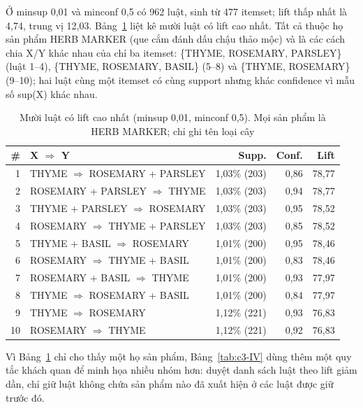 Ở minsup 0,01 và minconf 0,5 có 962 luật, sinh từ 477 itemset; lift thấp nhất là 4,74, trung vị 12,03. Bảng~\ref{tab:c3-III} liệt kê mười luật có lift cao nhất. Tất cả thuộc họ sản phẩm HERB MARKER (que cắm đánh dấu chậu thảo mộc) và là các cách chia X/Y khác nhau của chỉ ba itemset: \{THYME, ROSEMARY, PARSLEY\} (luật 1--4), \{THYME, ROSEMARY, BASIL\} (5--8) và \{THYME, ROSEMARY\} (9--10); hai luật cùng một itemset có cùng support nhưng khác confidence vì mẫu số sup(X) khác nhau.

\begin{table}[!t]
\centering\footnotesize
\caption{Mười luật có lift cao nhất (minsup 0,01, minconf 0,5). Mọi sản phẩm là
HERB MARKER; chỉ ghi tên loại cây}
\label{tab:c3-III}
\setlength{\tabcolsep}{3pt}
\begin{tabular}{rlrrr}
\hline
\textbf{\#} & \textbf{X $\Rightarrow$ Y} & \textbf{Supp.} & \textbf{Conf.} & \textbf{Lift} \\ \hline
1 & THYME $\Rightarrow$ ROSEMARY + PARSLEY & 1,03\% (203) & 0,86 & 78,77 \\
2 & ROSEMARY + PARSLEY $\Rightarrow$ THYME & 1,03\% (203) & 0,94 & 78,77 \\
3 & THYME + PARSLEY $\Rightarrow$ ROSEMARY & 1,03\% (203) & 0,95 & 78,52 \\
4 & ROSEMARY $\Rightarrow$ THYME + PARSLEY & 1,03\% (203) & 0,85 & 78,52 \\
5 & THYME + BASIL $\Rightarrow$ ROSEMARY & 1,01\% (200) & 0,95 & 78,46 \\
6 & ROSEMARY $\Rightarrow$ THYME + BASIL & 1,01\% (200) & 0,83 & 78,46 \\
7 & ROSEMARY + BASIL $\Rightarrow$ THYME & 1,01\% (200) & 0,93 & 77,97 \\
8 & THYME $\Rightarrow$ ROSEMARY + BASIL & 1,01\% (200) & 0,84 & 77,97 \\
9 & THYME $\Rightarrow$ ROSEMARY & 1,12\% (221) & 0,93 & 76,83 \\
10 & ROSEMARY $\Rightarrow$ THYME & 1,12\% (221) & 0,92 & 76,83 \\
\hline
\end{tabular}
\end{table}

Vì Bảng~\ref{tab:c3-III} chỉ cho thấy một họ sản phẩm, Bảng~\ref{tab:c3-IV} dùng thêm một quy tắc khách quan để minh họa nhiều nhóm hơn: duyệt danh sách luật theo lift giảm dần, chỉ giữ luật không chứa sản phẩm nào đã xuất hiện ở các luật được giữ trước đó.

